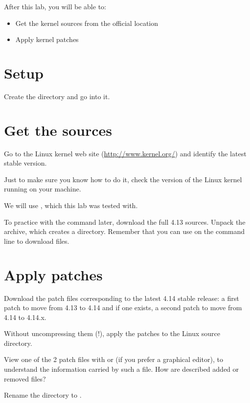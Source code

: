 
After this lab, you will be able to:
\begin{itemize}
\item Get the kernel sources from the official location
\item Apply kernel patches
\end{itemize}

\section{Setup}

Create the  directory and go into it.

\section{Get the sources}

Go to the Linux kernel web site (\url{http://www.kernel.org/}) and
identify the latest stable version.

Just to make sure you know how to do it, check the version of the
Linux kernel running on your machine.

We will use , which this lab was tested with.

To practice with the  command later, download the full 4.13
sources. Unpack the archive, which creates a 
directory. Remember that you can use  on the command
line to download files.

\section{Apply patches}

Download the patch files corresponding to the latest 4.14 stable
release: a first patch to move from 4.13 to 4.14 and if one exists,
a second patch to move from 4.14 to 4.14.x.

Without uncompressing them (!), apply the patches to the Linux
source directory.

View one of the 2 patch files with  or 
(if you prefer a graphical editor), to understand the information carried
by such a file. How are described added or removed files?

Rename the  directory to .
